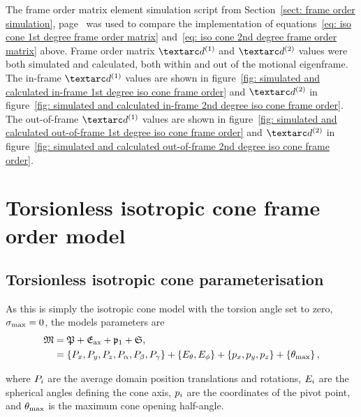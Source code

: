 
The frame order matrix element simulation script from Section~\ref{sect: frame order simulation}, page~\pageref{sect: frame order simulation} was used to compare the implementation of equations~\ref{eq: iso cone 1st degree frame order matrix} and~\ref{eq: iso cone 2nd degree frame order matrix} above.
Frame order matrix $\FOone$ and $\FOtwo$ values were both simulated and calculated, both within and out of the motional eigenframe.
The in-frame $\FOone$ values are shown in figure~\ref{fig: simulated and calculated in-frame 1st degree iso cone frame order} and $\FOtwo$ in figure~\ref{fig: simulated and calculated in-frame 2nd degree iso cone frame order}.
The out-of-frame $\FOone$ values are shown in figure~\ref{fig: simulated and calculated out-of-frame 1st degree iso cone frame order} and $\FOtwo$ in figure~\ref{fig: simulated and calculated out-of-frame 2nd degree iso cone frame order}.



\section{Torsionless isotropic cone frame order model}


\subsection{Torsionless isotropic cone parameterisation}

As this is simply the isotropic cone model with the torsion angle set to zero, $\sigma_\textrm{max} = 0$, the models parameters are
\begin{subequations}
\begin{align}
    \mathfrak{M} &= \mathfrak{P} + \mathfrak{E}_\textrm{ax} + \mathfrak{p}_1 + \mathfrak{S}, \\
              &= \left\{ P_x, P_y, P_z, P_\alpha, P_\beta, P_\gamma \right\} + \left\{ E_\theta, E_\phi \right\} + \left\{ p_x, p_y, p_z \right\} + \left\{ \theta_\textrm{max} \right\} ,
\end{align}
\end{subequations}

where $P_i$ are the average domain position translations and rotations, $E_i$ are the spherical angles defining the cone axis, $p_i$ are the coordinates of the pivot point, and $\theta_\textrm{max}$ is the maximum cone opening half-angle.


